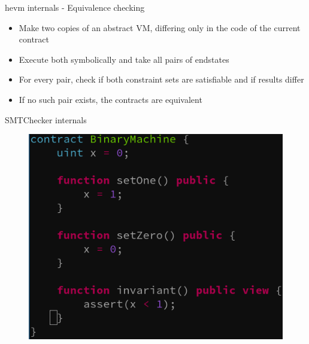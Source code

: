 \documentclass[aspectratio=169,10pt]{beamer}
\begin{document}
\begin{frame}[fragile]
\begin{center}
hevm internals - Equivalence checking
\;\\
\begin{itemize}
\item Make two copies of an abstract VM, differing only in the code of the current contract
\item Execute both symbolically and take all pairs of endstates
\item For every pair, check if both constraint sets are satisfiable and if results differ
\item If no such pair exists, the contracts are equivalent
\end{itemize}
\end{center}
\end{frame}

\begin{frame}[fragile]
\begin{center}
SMTChecker internals
\begin{figure}
	\includegraphics[scale=0.4]{images/binary_machine_code}
\end{figure}
\end{center}
\end{frame}
\end{document}
